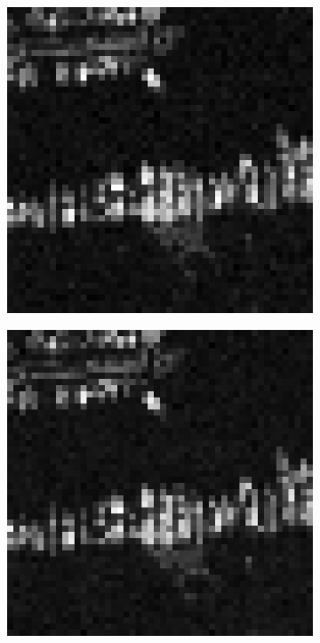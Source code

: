 \begin{figure}[t]
\begin{subfigure}{0.2\textwidth}
\end{subfigure}%
\begin{subfigure}{0.2\textwidth}
\includegraphics[width=\textwidth]{img/aliasedImg1L3}
\end{subfigure}%
\begin{subfigure}{0.2\textwidth}
\includegraphics[width=\textwidth]{img/aliasedImg1L4}

\end{subfigure}
\end{figure}
